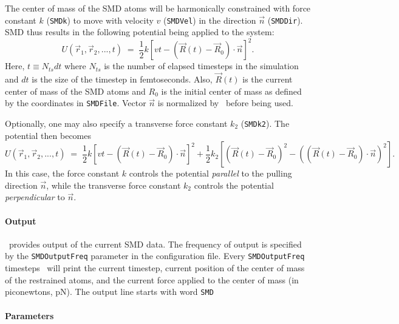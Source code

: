 The center of mass of the SMD atoms will be harmonically constrained with 
force constant $k$ ({\tt SMDk}) to move with velocity $v$ ({\tt SMDVel}) in 
the direction $\vec n$ ({\tt SMDDir}).  SMD thus results in the following
potential being applied to the system:
\begin{equation}
\label{eq:SMDpotential}
U(\vec r_1, \vec r_2, ..., t) \; = \; \frac{1}{2} 
  k\left[vt - (\vec R(t) - \vec R_0)\cdot \vec n \right]^2.
\end{equation}
Here, $t \equiv N_{ts} dt$ where $N_{ts}$ is the number of elapsed timesteps
in the simulation and $dt$ is the size of the timestep in femtoseconds.
Also, $\vec R(t)$ is the current center of mass of the SMD atoms and $R_0$ is
the initial center of mass as defined by the coordinates in {\tt SMDFile}.
Vector $\vec n$ is normalized by \NAMD\ before being used.

Optionally, one may also specify a transverse force constant $k_2$ ({\tt SMDk2}).
The potential then becomes
\begin{equation}
\label{eq:SMDpotential2}
U(\vec r_1, \vec r_2, ..., t) \; = \; \frac{1}{2} 
  k\left[vt - (\vec R(t) - \vec R_0)\cdot \vec n \right]^2 + \frac{1}{2}k_2\left[\left(\vec R(t) - \vec R_0\right)^2 - \left((\vec R(t) - \vec R_0) \cdot \vec n\right)^2\right].
\end{equation}
In this case, the force constant $k$ controls the potential \emph{parallel} to the pulling direction $\vec n$, while the transverse force constant $k_2$ controls the potential \emph{perpendicular} to $\vec n$.

\paragraph*{Output}

\NAMD\ provides output of the current SMD data. The frequency of
output is specified by the {\tt SMDOutputFreq} parameter in the
configuration file. Every {\tt SMDOutputFreq} timesteps \NAMD\ will
print the current timestep, current position of the center of mass of the
restrained atoms, and
the current force applied to the center of mass (in piconewtons, pN).
The output line starts with word {\tt SMD}

\paragraph*{Parameters}

